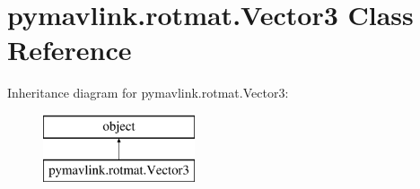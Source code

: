 \hypertarget{classpymavlink_1_1rotmat_1_1Vector3}{}\section{pymavlink.\+rotmat.\+Vector3 Class Reference}
\label{classpymavlink_1_1rotmat_1_1Vector3}
Inheritance diagram for pymavlink.\+rotmat.\+Vector3\+:\begin{figure}[H]
\begin{center}
\leavevmode
\includegraphics[height=2.000000cm]{classpymavlink_1_1rotmat_1_1Vector3}
\end{center}
\end{figure}
